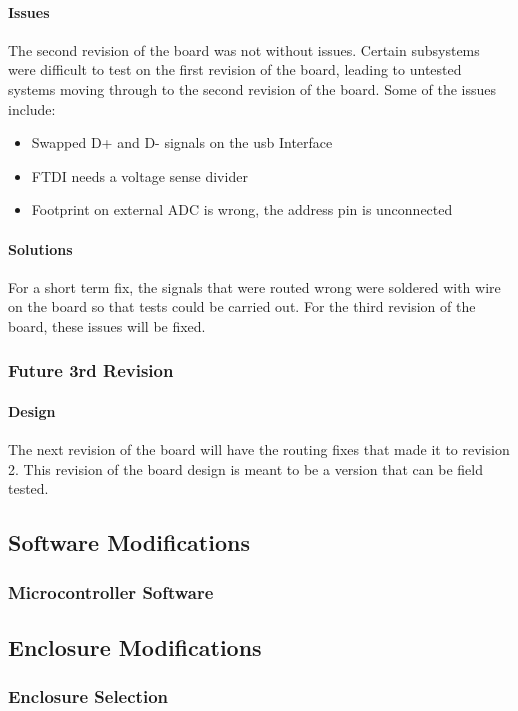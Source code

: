 \documentclass{article}
\numberwithin{figure}{section}
\numberwithin{equation}{section}
\begin{document}
{\paragraph{Issues}
The second revision of the board was not without issues. Certain subsystems were difficult to test on the first revision of the board, leading to untested systems moving through to the second revision of the board. Some of the issues include:
\begin{itemize}
\item Swapped D+ and D- signals on the usb Interface
\item FTDI needs a voltage sense divider
\item Footprint on external ADC is wrong, the address pin is unconnected
\end{itemize}
\paragraph{Solutions}
For a short term fix, the signals that were routed wrong were soldered with wire on the board so that tests could be carried out. For the third revision of the board, these issues will be fixed. 
\subsubsection{Future 3rd Revision}\label{conclusion-pcb-rev3}
\paragraph{Design}
The next revision of the board will have the routing fixes that made it to revision 2. This revision of the board design is meant to be a version that can be field tested. 
\subsection{Software Modifications}\label{conclusion-software}
\subsubsection{Microcontroller Software}\label{conclusion-mcu-software}

\subsection{Enclosure Modifications}\label{conclusion-enclosure}
\subsubsection{Enclosure Selection}\label{conclusion-enc-selection}
}
\end{document}
